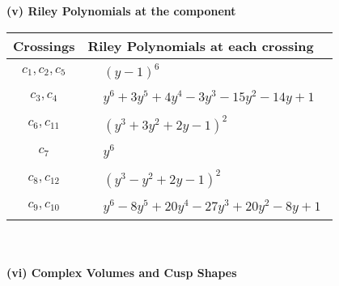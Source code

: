 \documentclass[1p]{elsarticle_modified}
\theoremstyle{definition}
\begin{document}
\newpage\renewcommand{\arraystretch}{1}
\flushleft \textbf{(v) Riley Polynomials at the component}\newline \\
\begin{tabular}{m{50pt}|m{274pt}}
Crossings & \hspace{64pt}Riley Polynomials at each crossing \\
\hline $$\begin{aligned}c_{1},c_{2},c_{5}\end{aligned}$$&$\begin{aligned}
&(y-1)^6
\end{aligned}$\\
\hline $$\begin{aligned}c_{3},c_{4}\end{aligned}$$&$\begin{aligned}
&y^6+3 y^5+4 y^4-3 y^3-15 y^2-14 y+1
\end{aligned}$\\
\hline $$\begin{aligned}c_{6},c_{11}\end{aligned}$$&$\begin{aligned}
&(y^3+3 y^2+2 y-1)^2
\end{aligned}$\\
\hline $$\begin{aligned}c_{7}\end{aligned}$$&$\begin{aligned}
&y^6
\end{aligned}$\\
\hline $$\begin{aligned}c_{8},c_{12}\end{aligned}$$&$\begin{aligned}
&(y^3- y^2+2 y-1)^2
\end{aligned}$\\
\hline $$\begin{aligned}c_{9},c_{10}\end{aligned}$$&$\begin{aligned}
&y^6-8 y^5+20 y^4-27 y^3+20 y^2-8 y+1
\end{aligned}$\\
\hline
\end{tabular}\\~\\
\newpage\flushleft \textbf{(vi) Complex Volumes and Cusp Shapes}
\end{document}
